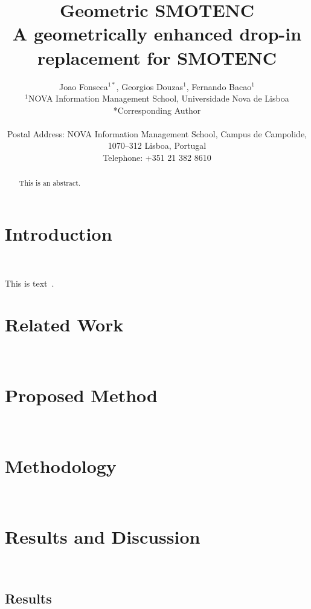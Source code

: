 \documentclass[parskip=full]{scrartcl}
\title{Geometric SMOTENC \\ \LARGE{A geometrically enhanced drop-in
replacement for SMOTENC}}
\author{%
	Joao Fonseca\(^{1*}\), Georgios Douzas\(^{1}\), Fernando Bacao\(^{1}\)
	\\
	\small{\(^{1}\)NOVA Information Management School, Universidade Nova de Lisboa}
	\\
	\small{*Corresponding Author}
	\\
	\\
	\small{Postal Address: NOVA Information Management School, Campus de
    Campolide, 1070--312 Lisboa, Portugal}
	\\
	\small{Telephone: +351 21 382 8610}
}
\date{}
\begin{document}
\maketitle

\begin{abstract}
    This is an abstract.
\end{abstract}

\section{Introduction}~\label{sec:introduction}

This is text~\cite{Chawla2002}.


\section{Related Work}~\label{sec:related_work}

\section{Proposed Method}~\label{sec:proposed_method}

\section{Methodology}~\label{sec:methodology}

\section{Results and Discussion}~\label{sec:results_and_discussion}

\subsection{Results}~\label{sec:results}






\end{document}
